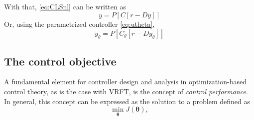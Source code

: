 With that, \eqref{eq:CLSnl} can be written as
\begin{equation}
   y = P[C[r-Dy]]
   \label{eq:ymf}
\end{equation}
Or, using the  parametrized controller \eqref{eq:utheta},
\begin{equation}
   y_{\theta} = P[C_{\theta}[r-Dy_{\theta}]]
   \label{eq:ytheta}
\end{equation}


\subsection{The control objective}%
\label{sub:the_reference_model}

A fundamental element for controller design and analysis in optimization-based control theory, as is the case with VRFT, is the concept of \textit{control performance}. In general, this concept can be expressed as the solution to a problem defined as
\begin{equation}
   \min_{\bm{\theta}} J(\bm{\theta}),
\end{equation}
